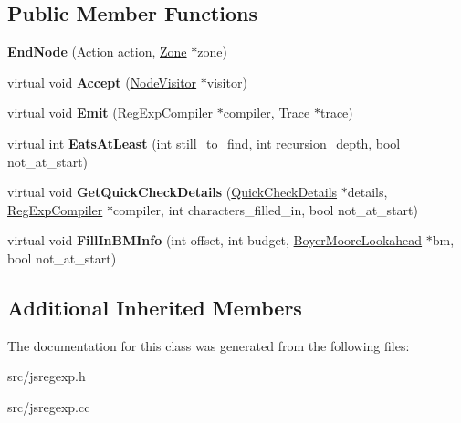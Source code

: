\subsection*{Public Member Functions}
\begin{DoxyCompactItemize}
\item 
\hypertarget{classv8_1_1internal_1_1_end_node_a83274b03e3eb90631e8e6cbe6304bd7b}{}{\bfseries End\+Node} (Action action, \hyperlink{classv8_1_1internal_1_1_zone}{Zone} $\ast$zone)\label{classv8_1_1internal_1_1_end_node_a83274b03e3eb90631e8e6cbe6304bd7b}

\item 
\hypertarget{classv8_1_1internal_1_1_end_node_aae062820adcd18e8a4a37cc0a6a87fc8}{}virtual void {\bfseries Accept} (\hyperlink{classv8_1_1internal_1_1_node_visitor}{Node\+Visitor} $\ast$visitor)\label{classv8_1_1internal_1_1_end_node_aae062820adcd18e8a4a37cc0a6a87fc8}

\item 
\hypertarget{classv8_1_1internal_1_1_end_node_aa9766fcddb47db9257ab45eaf7bdeb6c}{}virtual void {\bfseries Emit} (\hyperlink{classv8_1_1internal_1_1_reg_exp_compiler}{Reg\+Exp\+Compiler} $\ast$compiler, \hyperlink{classv8_1_1internal_1_1_trace}{Trace} $\ast$trace)\label{classv8_1_1internal_1_1_end_node_aa9766fcddb47db9257ab45eaf7bdeb6c}

\item 
\hypertarget{classv8_1_1internal_1_1_end_node_aa7a860f395270790bc252f5fa2d65598}{}virtual int {\bfseries Eats\+At\+Least} (int still\+\_\+to\+\_\+find, int recursion\+\_\+depth, bool not\+\_\+at\+\_\+start)\label{classv8_1_1internal_1_1_end_node_aa7a860f395270790bc252f5fa2d65598}

\item 
\hypertarget{classv8_1_1internal_1_1_end_node_a2d41abdd7fd0c170241068499dba41b9}{}virtual void {\bfseries Get\+Quick\+Check\+Details} (\hyperlink{classv8_1_1internal_1_1_quick_check_details}{Quick\+Check\+Details} $\ast$details, \hyperlink{classv8_1_1internal_1_1_reg_exp_compiler}{Reg\+Exp\+Compiler} $\ast$compiler, int characters\+\_\+filled\+\_\+in, bool not\+\_\+at\+\_\+start)\label{classv8_1_1internal_1_1_end_node_a2d41abdd7fd0c170241068499dba41b9}

\item 
\hypertarget{classv8_1_1internal_1_1_end_node_abc8072d026249da0d031a7bc37ad9470}{}virtual void {\bfseries Fill\+In\+B\+M\+Info} (int offset, int budget, \hyperlink{classv8_1_1internal_1_1_boyer_moore_lookahead}{Boyer\+Moore\+Lookahead} $\ast$bm, bool not\+\_\+at\+\_\+start)\label{classv8_1_1internal_1_1_end_node_abc8072d026249da0d031a7bc37ad9470}

\end{DoxyCompactItemize}
\subsection*{Additional Inherited Members}


The documentation for this class was generated from the following files\+:\begin{DoxyCompactItemize}
\item 
src/jsregexp.\+h\item 
src/jsregexp.\+cc\end{DoxyCompactItemize}
